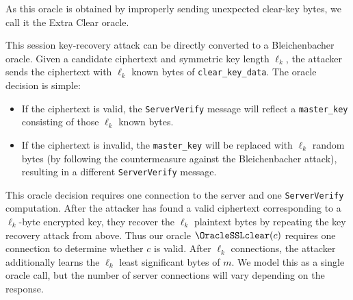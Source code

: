 
As this oracle is obtained by improperly sending unexpected clear-key bytes,
we call it the Extra Clear oracle.

This session key-recovery attack can be directly converted to a Bleichenbacher oracle. Given a candidate ciphertext and symmetric key length $\ell_k$, the attacker sends the ciphertext with $\ell_k$ known bytes of \texttt{clear\_key\_data}. The oracle decision is simple:
\begin{itemize}
\item If the ciphertext is valid, the \texttt{ServerVerify} message will reflect a \texttt{master\_key} consisting of those $\ell_k$ known bytes.
\item If the ciphertext is invalid, the \texttt{master\_key} will be replaced with $\ell_k$ random bytes (by following the countermeasure against the Bleichenbacher attack), resulting in a different \texttt{ServerVerify} message.
\end{itemize}

This oracle decision requires one connection to the server and one \texttt{ServerVerify} computation. After the attacker has found a valid ciphertext corresponding to a $\ell_k$-byte encrypted key, they recover the $\ell_k$ plaintext bytes by repeating the key recovery attack from above.  Thus our oracle $\OracleSSLclear(c)$ requires one connection to determine whether $c$ is valid.  After $\ell_k$ connections, the attacker additionally learns the $\ell_k$ least significant bytes of $m$.  We model this as a single oracle call, but the number of server connections will vary depending on the response.
